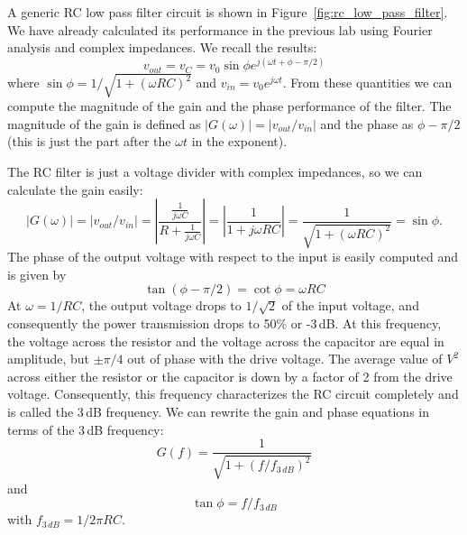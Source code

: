 \documentclass{article}
\begin{document}
A generic RC low pass filter circuit is shown in Figure~\ref{fig:rc_low_pass_filter}. We have already calculated its performance in the previous lab using Fourier analysis and complex impedances. We recall the results:
\begin{equation}
v_{out} = v_C = v_0 \sin\phi e^{j(\omega t + \phi - \pi/2)}
\end{equation}
where $\sin\phi = 1/\sqrt{1 + (\omega R C)^2}$ and $v_{in} = v_0 e^{j \omega t}$. From these quantities we can compute the magnitude of the gain and the phase performance of the filter. The magnitude of the gain is defined as $|G(\omega)| = |v_{out} / v_{in}|$ and the phase as $\phi - \pi/2$ (this is just the part after the $\omega t$ in the exponent).

The RC filter is just a voltage divider with complex impedances, so we can calculate the gain easily:
\begin{equation}
|G(\omega)| = |v_{out} / v_{in}| = \left|\frac{\frac{1}{j\omega C}}{R + \frac{1}{j\omega C}}\right| = \left|\frac{1}{1+j\omega RC}\right| = \frac{1}{\sqrt{1 + (\omega R C)^2}} = \sin\phi.
\end{equation}
The phase of the output voltage with respect to the input is easily computed and is given by
\begin{equation}
\tan(\phi - \pi/2) = \cot \phi = \omega RC
\end{equation}
At $\omega = 1/RC$, the output voltage drops to $1/\sqrt{2}$ of the input voltage, and consequently the power transmission drops to 50\% or -3\,dB\footnotemark{}. At this frequency, the voltage across the resistor and the voltage across the capacitor are equal in amplitude, but $\pm \pi/4$ out of phase with the drive voltage. The average value of $V^2$ across either the resistor or the capacitor is down by a factor of 2 from the drive voltage. Consequently, this frequency characterizes the RC circuit completely and is called the 3\,dB frequency. We can rewrite the gain and phase equations in terms of the 3\,dB frequency:
\begin{equation}
G(f) = \frac{1}{\sqrt{1 + (f/f_{3\,dB})^2}}
\end{equation}
and
\begin{equation}
\tan\phi = f/f_{3\,dB}
\end{equation}
with $f_{3\,dB} = 1/2\pi RC$.

\end{document}
